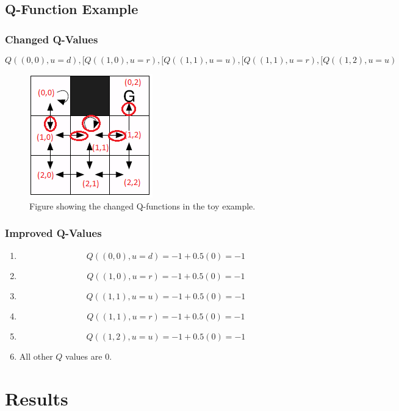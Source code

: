 \documentclass{article}
\begin{document}
\subsection{Q-Function Example}
\subsubsection*{Changed Q-Values}
\[Q((0,0),u=d), [Q((1,0),u=r), [Q((1,1),u=u),[Q((1,1),u=r), [Q((1,2),u=u)\]

\begin{figure}[ht!]
\centering
  \includegraphics[width=0.4\linewidth]{qfunction}
  \caption{Figure showing the changed Q-functions in the toy example.}
  \label{fig:qFunctionTable}
\end{figure}
\subsubsection*{Improved Q-Values}
\begin{enumerate}
\item \[Q((0,0),u=d)=-1+0.5(0)=-1\]
\item \[Q((1,0),u=r)=-1+0.5(0)=-1\]
\item \[Q((1,1),u=u)=-1+0.5(0)=-1\]
\item \[Q((1,1),u=r)=-1+0.5(0)=-1\]
\item \[Q((1,2),u=u)=-1+0.5(0)=-1\]
\item All other $Q$ values are $0$.
\end{enumerate}





\section{Results}
\end{document}
